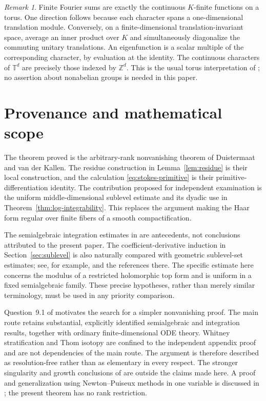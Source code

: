 \documentclass[11pt]{article}
\numberwithin{equation}{section}
\theoremstyle{definition}
\theoremstyle{remark}
\newtheorem{remark}[theorem]{Remark}
\newcommand{\Z}{\mathbb Z}
\newcommand{\T}{\mathbb T}
\begin{document}
\begin{remark}
Finite Fourier sums are exactly the continuous $K$-finite functions on
a torus. One direction follows because each character spans a
one-dimensional translation module. Conversely, on a finite-dimensional
translation-invariant space, average an inner product over $K$ and
simultaneously diagonalize the commuting unitary translations. An
eigenfunction is a scalar multiple of the corresponding character,
by evaluation at the identity. The continuous characters of $\T^d$
are precisely those indexed by $\Z^d$. This is the usual torus
interpretation of \cite{DvK}; no assertion about nonabelian groups is
needed in this paper.
\end{remark}

\section{Provenance and mathematical scope}\label{sec:scope}
The theorem proved is the arbitrary-rank nonvanishing theorem of
Duistermaat and van der Kallen. The residue construction in
Lemma~\ref{lem:residue} is their local construction, and the calculation
\eqref{eq:stokes-primitive} is their primitive-differentiation identity.
The contribution proposed for independent examination is the uniform
middle-dimensional sublevel estimate and its dyadic use in
Theorem~\ref{thm:log-integrability}. This replaces the argument making
the Haar form regular over finite fibers of a smooth compactification.

The semialgebraic integration estimates in \cite{HKT} are antecedents,
not conclusions attributed to the present paper. The coefficient-derivative
induction in Section~\ref{sec:sublevel} is also naturally compared with
geometric sublevel-set estimates; see, for example, \cite{Gressman} and
the references there. The specific estimate here concerns the modulus
of a restricted holomorphic top form and is uniform in a fixed
semialgebraic family. These precise hypotheses, rather than merely
similar terminology, must be used in any priority comparison.

Question~9.1 of \cite{Kiselman} motivates the search for a simpler
nonvanishing proof. The main route retains substantial, explicitly
identified semialgebraic and integration results, together with ordinary
finite-dimensional ODE theory. Whitney stratification and Thom isotopy
are confined to the independent appendix proof and are not dependencies
of the main route. The argument is therefore described as resolution-free
rather than as elementary in every respect. The stronger singularity and growth conclusions of
\cite[Theorem 5]{DvK} are outside the claims made here. A proof and
generalization using Newton--Puiseux methods in one variable is discussed
in \cite{ES}; the present theorem has no rank restriction.
\end{document}
